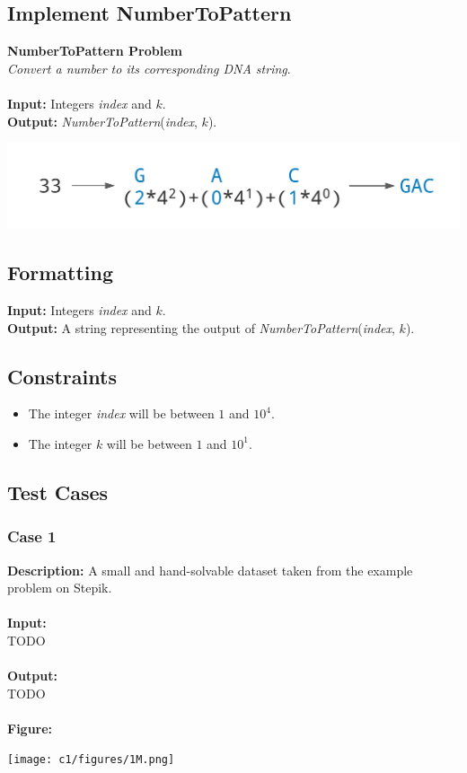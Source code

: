 \documentclass{article}
\begin{document}
\subsection{Implement NumberToPattern}
\hline\vspace{5}
\noindent \textbf{NumberToPattern Problem}\\
\emph{Convert a number to its corresponding DNA string}.\\ \\
\textbf{Input:} Integers \emph{index} and $k$.\\
\textbf{Output:} \emph{NumberToPattern}(\emph{index}, $k$).
\begin{center}
    \includegraphics[scale=0.2]{c1/logos/1M.png} 
\end{center}
\hline\vspace{5}

\subsection*{Formatting}
\textbf{Input:} Integers \emph{index} and $k$.\\
\noindent \textbf{Output:} A string representing the output of \emph{NumberToPattern}(\emph{index}, $k$).

\subsection*{Constraints}
\begin{itemize}
    \item The integer \emph{index} will be between $1$ and $10^4$.
    \item The integer $k$ will be between $1$ and $10^1$.
\end{itemize}
\pagebreak

\subsection*{Test Cases}
\subsubsection*{Case 1}
\hline \vspace{5}
\textbf{Description:} A small and hand-solvable dataset taken from the example problem on Stepik.\\ \\
\noindent \textbf{Input:}\\
TODO \\ \\
\noindent \textbf{Output:}\\
TODO \\ \\
\noindent \textbf{Figure:}
\begin{center}
    \texttt{[image: c1/figures/1M.png]}
\end{center}
\end{document}
